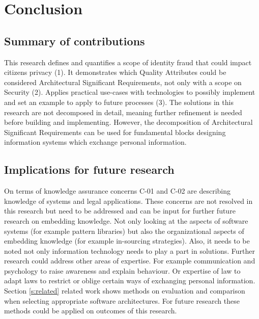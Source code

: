 \chapter{Conclusion}\label{s:conclusion}
\section{Summary of contributions}
This research defines and quantifies a scope of identity fraud that could impact citizens privacy (1). It demonstrates which Quality Attributes could be considered Architectural Significant Requirements, not only with a scope on Security (2). Applies practical use-cases with technologies to possibly implement and set an example to apply to future processes (3). The solutions in this research are not decomposed in detail, meaning further refinement is needed before building and implementing. However, the decomposition of Architectural Significant Requirements can be used for fundamental blocks designing information systems which exchange personal information. 

\section{Implications for future research}\label{Implications}
On terms of knowledge assurance concerns C-01 and C-02 are describing knowledge of systems and legal applications. These concerns are not resolved in this research but need to be addressed and can be input for further future research on embedding knowledge. Not only looking at the aspects of software systems (for example pattern libraries) but also the organizational aspects of embedding knowledge (for example in-sourcing strategies). 
Also, it needs to be noted not only information technology needs to play a part in solutions. Further research could address other areas of expertise. For example communication and psychology to raise awareness and explain behaviour. Or expertise of law to adapt laws to restrict or oblige certain ways of exchanging personal information. 
Section \ref{s:related} related work shows methods on evaluation and comparison when selecting appropriate software architectures. For future research these methods could be applied on outcomes of this research.

